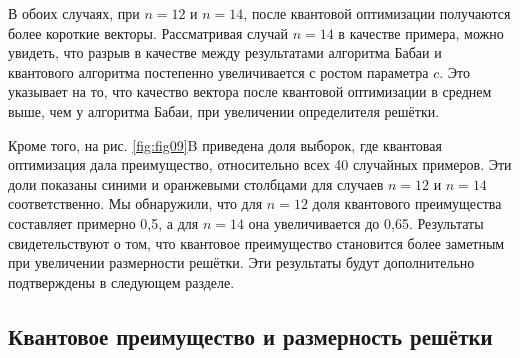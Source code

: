В обоих случаях, при $n = 12$ и $n = 14$, после квантовой оптимизации
получаются более короткие векторы. Рассматривая случай $n = 14$ в качестве
примера, можно увидеть, что разрыв в качестве между результатами алгоритма
Бабаи и квантового алгоритма постепенно увеличивается с ростом параметра $c$.
Это указывает на то, что качество вектора после квантовой оптимизации в среднем
выше, чем у алгоритма Бабаи, при увеличении определителя решётки.

Кроме того, на рис. \ref{fig:fig09}B приведена доля выборок, где квантовая
оптимизация дала преимущество, относительно всех 40 случайных примеров. Эти
доли показаны синими и оранжевыми столбцами для случаев $n = 12$ и $n = 14$
соответственно. Мы обнаружили, что для $n = 12$ доля квантового преимущества
составляет примерно 0{,}5, а для $n = 14$ она увеличивается до 0{,}65.
Результаты свидетельствуют о том, что квантовое преимущество становится более
заметным при увеличении размерности решётки. Эти результаты будут дополнительно
подтверждены в следующем разделе.

\subsection*{Квантовое преимущество и размерность решётки}

